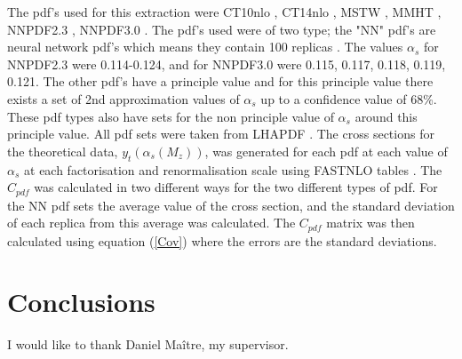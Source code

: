 \documentclass[12pt, onecolumn]{revtex4}    %
\begin{document}
The pdf's used for this extraction were CT10nlo \cite{CT10}, CT14nlo \cite{CT14}, MSTW \cite{MSTW}, MMHT \cite{MMHT1, MMHT2}, NNPDF2.3 \cite{NN23}, NNPDF3.0 \cite{NN30}. The pdf's used were of two type; the "NN" pdf's are neural network pdf's which means they contain 100 replicas \cite{NN23}.  The values ${\alpha_s}$ for NNPDF2.3 were 0.114-0.124, and for NNPDF3.0 were 0.115, 0.117, 0.118, 0.119, 0.121. The other pdf's have a principle value and for this principle value there exists a set of 2nd approximation values of ${\alpha_s}$  up to a confidence value of 68\%. These pdf types also have sets for the non principle value of ${\alpha_s}$ around this principle value. All pdf sets were taken from LHAPDF \cite{LHAPDF}. The cross sections for the theoretical data, ${y_t(\alpha_s(M_z))}$, was generated for each pdf at each value of ${\alpha_s}$ at each factorisation and renormalisation scale using FASTNLO tables \cite{FAST}. The ${C_{pdf}}$ was calculated in two different ways for the two different types of pdf. For the NN pdf sets the average value of the cross section, and the standard deviation of each replica from this average was calculated. The ${C_{pdf}}$ matrix was then calculated using equation (\ref{Cov}) where the errors are the standard deviations. 
 
\section{Conclusions}



\begin{acknowledgments}
I would like to thank Daniel Ma\^itre, my supervisor. 
\end{acknowledgments}
\end{document}

